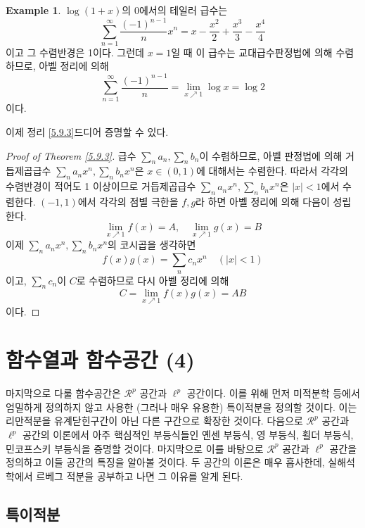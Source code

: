 \documentclass[11pt]{book}
\numberwithin{equation}{chapter}
\newcommand{\abs}[1]{\left\vert#1\right\vert}
\theoremstyle{definition}
\newtheorem*{ex}{Example}
\begin{document}
\begin{ex}
    \(\log (1+x)\)의 0에서의 테일러 급수는
    \[
    \sum_{n=1}^\infty \frac{(-1)^{n-1}}{n} x^n = x - \frac{x^2}{2} + \frac{x^3}{3} - \frac{x^4}{4}    
    \]
    이고 그 수렴반경은 1이다. 그런데 \(x = 1\)일 때 이 급수는 교대급수판정법에 의해 수렴하므로, 아벨 정리에 의해
    \[
    \sum_{n=1}^\infty \frac{(-1)^{n-1}}{n} = \lim_{x \nearrow 1} \log x = \log 2    
    \]
    이다.
\end{ex}

이제 정리 \ref{5.9.3}\을 드디어 증명할 수 있다.

\begin{proof}[Proof of Theorem \ref*{5.9.3}]
    급수 \(\sum_n a_n, \sum_n b_n\)이 수렴하므로, 아벨 판정법에 의해 거듭제곱급수 \(\sum_n a_n x^n, \sum_n b_n x^n\)은 \(x \in (0, 1)\)에 대해서는 수렴한다. 따라서 각각의 수렴반경이 적어도 1 이상이므로 거듭제곱급수 \(\sum_n a_n x^n, \sum_n b_n x^n\)은 \(\abs{x} < 1\)에서 수렴한다. \((-1, 1)\)에서 각각의 점별 극한을 \(f, g\)라 하면 아벨 정리에 의해 다음이 성립한다.
    \[
    \lim_{x \nearrow 1} f(x) = A, \quad \lim_{x \nearrow 1} g(x) = B
    \]
    이제 \(\sum_n a_n x^n, \sum_n b_n x^n\)의 코시곱을 생각하면
    \[
    f(x)g(x) = \sum_n c_n x^n \quad (\abs{x} < 1)    
    \]
    이고, \(\sum_n c_n\)이 \(C\)로 수렴하므로 다시 아벨 정리에 의해
    \[
      C = \lim_{x \nearrow 1} f(x)g(x) = AB 
    \]
    이다.
\end{proof}



\chapter{함수열과 함수공간 (4)}

마지막으로 다룰 함수공간은 \(\mathcal{R}^p\) 공간과 \(\ell^p\) 공간이다. 이를 위해 먼저 미적분학 등에서 엄밀하게 정의하지 않고 사용한 (그러나 매우 유용한) 특이적분을 정의할 것이다. 이는 리만적분을 유계닫힌구간이 아닌 다른 구간으로 확장한 것이다. 다음으로 \(\mathcal{R}^p\) 공간과 \(\ell^p\) 공간의 이론에서 아주 핵심적인 부등식들인 옌센 부등식, 영 부등식, 횔더 부등식, 민코프스키 부등식을 증명할 것이다. 마지막으로 이를 바탕으로 \(\mathcal{R}^p\) 공간과 \(\ell^p\) 공간을 정의하고 이들 공간의 특징을 알아볼 것이다. 두 공간의 이론은 매우 흡사한데, 실해석학에서 르베그 적분을 공부하고 나면 그 이유를 알게 된다.

\section{특이적분}
\end{document}
